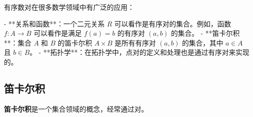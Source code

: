 有序数对在很多数学领域中有广泛的应用：

- **关系和函数**：一个二元关系 \(R\) 可以看作是有序对的集合。例如，函数 \(f : A \to B\) 可以看作是满足 \(f(a) = b\) 的有序对 \((a, b)\) 的集合。
- **笛卡尔积**：集合 \(A\) 和 \(B\) 的笛卡尔积 \(A \times B\) 是所有有序对 \((a, b)\) 的集合，其中 \(a \in A\) 且 \(b \in B\)。
- **拓扑学**：在拓扑学中，点对的定义和处理也是通过有序对来实现的。

\subsection{笛卡尔积}

\textbf{笛卡尔积}是一个集合领域的概念，经常通过对。

